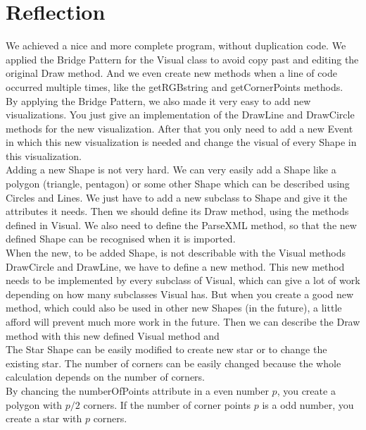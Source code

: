 \documentclass[a4paper,12pt]{article}
\begin{document}
\section{Reflection}
We achieved a nice and more complete program, without duplication code. We applied the Bridge Pattern for the Visual class to avoid copy past and editing the original Draw method. And we even create new methods when a line of code occurred multiple times, like the getRGBstring and getCornerPoints methods.
\\  %
By applying the Bridge Pattern, we also made it very easy to add new visualizations. You just give an implementation of the DrawLine and DrawCircle methods for the new visualization. After that you only need to add a new Event in which this new visualization is needed and change the visual of every Shape in this visualization.
\\  %
Adding a new Shape is not very hard. We can very easily add a Shape like a polygon (triangle, pentagon) or some other Shape which can be described using Circles and Lines. We just have to add a new subclass to Shape and give it the attributes it needs. Then we should define its Draw method, using the methods defined in Visual. We also need to define the ParseXML method, so that the new defined Shape can be recognised when it is imported.
\\
When the new, to be added Shape, is not describable with the Visual methods DrawCircle and DrawLine, we have to define a new method. This new method needs to be implemented by every subclass of Visual, which can give a lot of work depending on how many subclasses Visual has. But when you create a good new method, which could also be used in other new Shapes (in the future), a little afford will prevent much more work in the future. Then we can describe the Draw method with this new defined Visual method and 
\\ %

The Star Shape can be easily modified to create new star or to change the existing star. The number of corners can be easily changed because the whole calculation depends on the number of corners.
\\
By chancing the numberOfPoints attribute in a even number $p$, you create a polygon with $p/2$ corners. If the number of corner points $p$ is a odd number, you create a star with $p$ corners.
\end{document}
